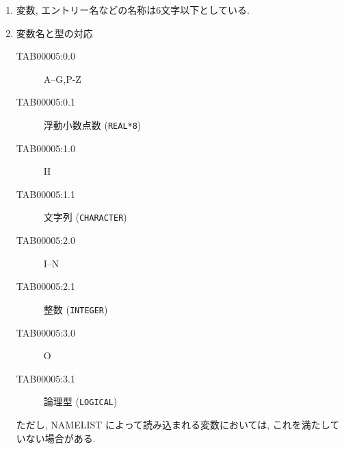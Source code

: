 \begin{enumerate}

\item 変数, エントリー名などの名称は6文字以下としている.

\item 変数名と型の対応 
\begin{center}
\begin{description}
\item[TAB00005:0.0] A--G,P-Z
\item[TAB00005:0.1] 浮動小数点数 ({\tt REAL*8})
\item[TAB00005:1.0] H
\item[TAB00005:1.1] 文字列 ({\tt CHARACTER})
\item[TAB00005:2.0] I--N
\item[TAB00005:2.1] 整数   ({\tt INTEGER})
\item[TAB00005:3.0] O
\item[TAB00005:3.1] 論理型 ({\tt LOGICAL})
\end{description}
\end{center}
ただし, NAMELIST によって読み込まれる変数においては, 
これを満たしていない場合がある.


\end{enumerate}
